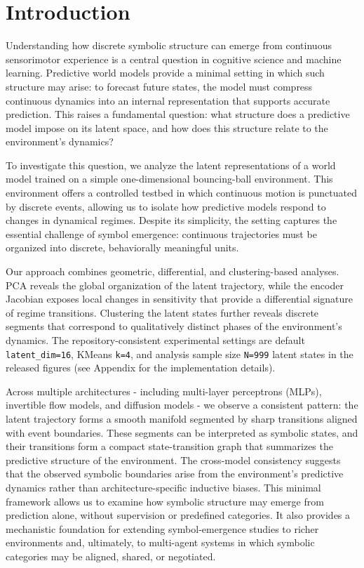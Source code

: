 \documentclass[11pt]{article}
\begin{document}
\section{Introduction}
Understanding how discrete symbolic structure can emerge from continuous sensorimotor experience is a central question in cognitive science and machine learning. Predictive world models provide a minimal setting in which such structure may arise: to forecast future states, the model must compress continuous dynamics into an internal representation that supports accurate prediction. This raises a fundamental question: what structure does a predictive model impose on its latent space, and how does this structure relate to the environment's dynamics?

To investigate this question, we analyze the latent representations of a world model trained on a simple one-dimensional bouncing-ball environment. This environment offers a controlled testbed in which continuous motion is punctuated by discrete events, allowing us to isolate how predictive models respond to changes in dynamical regimes. Despite its simplicity, the setting captures the essential challenge of symbol emergence: continuous trajectories must be organized into discrete, behaviorally meaningful units.

Our approach combines geometric, differential, and clustering-based analyses. PCA reveals the global organization of the latent trajectory, while the encoder Jacobian exposes local changes in sensitivity that provide a differential signature of regime transitions. Clustering the latent states further reveals discrete segments that correspond to qualitatively distinct phases of the environment's dynamics. The repository-consistent experimental settings are default \texttt{latent_dim=16}, KMeans \texttt{k=4}, and analysis sample size \texttt{N=999} latent states in the released figures (see Appendix for the implementation details).


Across multiple architectures - including multi-layer perceptrons (MLPs), invertible flow models, and diffusion models - we observe a consistent pattern: the latent trajectory forms a smooth manifold segmented by sharp transitions aligned with event boundaries. These segments can be interpreted as symbolic states, and their transitions form a compact state-transition graph that summarizes the predictive structure of the environment. The cross-model consistency suggests that the observed symbolic boundaries arise from the environment's predictive dynamics rather than architecture-specific inductive biases.
This minimal framework allows us to examine how symbolic structure may emerge from prediction alone, without supervision or predefined categories. It also provides a mechanistic foundation for extending symbol-emergence studies to richer environments and, ultimately, to multi-agent systems in which symbolic categories may be aligned, shared, or negotiated.
\end{document}
